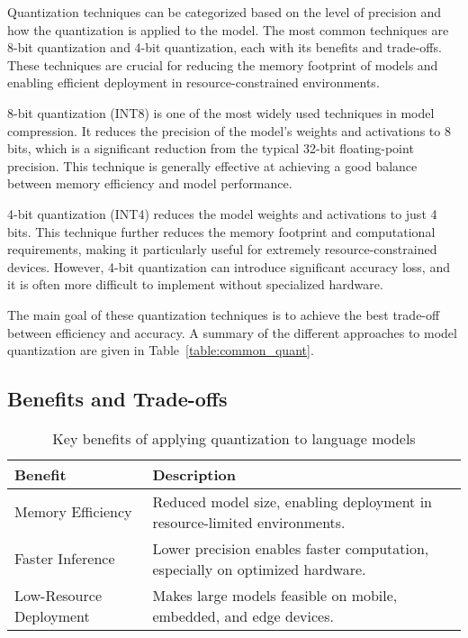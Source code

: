 Quantization techniques can be categorized based on the level of precision and how the
quantization is applied to the model. The most common techniques are 8-bit quantization
and 4-bit quantization, each with its benefits and trade-offs. These techniques are crucial
for reducing the memory footprint of models and enabling efficient deployment in resource-constrained
environments.

8-bit quantization (INT8) is one of the most widely used techniques in model compression.
It reduces the precision of the model's weights and activations to 8 bits, which
is a significant reduction from the typical 32-bit floating-point precision. This technique
is generally effective at achieving a good balance between memory efficiency and model
performance.

4-bit quantization (INT4) reduces the model weights and activations to just 4 bits.
This technique further reduces the memory footprint and computational requirements,
making it particularly useful for extremely resource-constrained devices. However, 4-bit
quantization can introduce significant accuracy loss, and it is often more difficult to
implement without specialized hardware.

The main goal of these quantization techniques is to achieve the best trade-off between
efficiency and accuracy. A summary of the different approaches to model quantization are given in Table~\ref{table:common_quant}.

\subsection{Benefits and Trade-offs}

\begin{table}[t]
  \centering
  \scriptsize
  \renewcommand{\arraystretch}{1.3}
  \begin{tabularx}{0.95\textwidth}{
    >{\raggedright\arraybackslash}p{5cm}
    >{\raggedright\arraybackslash}X
  }
    \toprule
    \textbf{Benefit} & \textbf{Description} \\
    \midrule
    Memory Efficiency & Reduced model size, enabling deployment in resource-limited environments. \\
    Faster Inference & Lower precision enables faster computation, especially on optimized hardware. \\
    Low-Resource Deployment & Makes large models feasible on mobile, embedded, and edge devices. \\
    \bottomrule
  \end{tabularx}
  \caption{Key benefits of applying quantization to language models}
  \label{table:benefits-quant}
\end{table}


